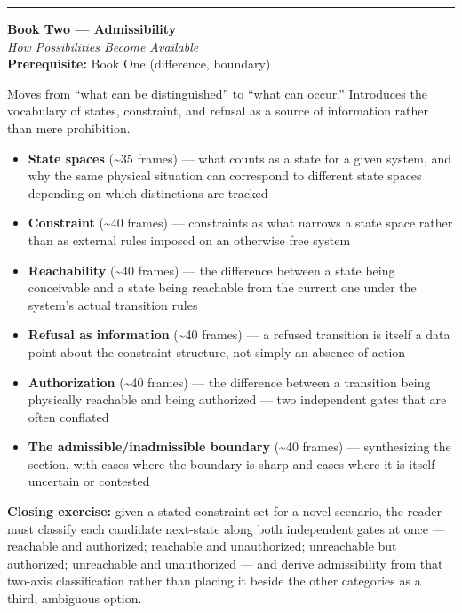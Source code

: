 \documentclass[11pt]{article}
\newenvironment{bookentry}[3]{%
  \par\noindent\rule{\linewidth}{0.5pt}\par\vspace{0.5em}
  {\Large\bfseries #1}\\[0.15em]
  {\itshape\large #2}\\[0.3em]
  {\small\textbf{Prerequisite:} #3}\par\vspace{0.6em}
}{\par\vspace{0.8em}}
\newenvironment{sectionlist}{%
  \begin{itemize}[leftmargin=1.4em, itemsep=0.45em, topsep=0.3em]
}{%
  \end{itemize}
}
\newcommand{\secitem}[3]{\item \textbf{#1} (\textasciitilde#2 frames) --- #3}
\begin{document}
\begin{bookentry}{Book Two --- Admissibility}{How Possibilities Become Available}{Book One (difference, boundary)}
Moves from ``what can be distinguished'' to ``what can occur.'' Introduces the vocabulary of states, constraint, and refusal as a source of information rather than mere prohibition.

\begin{sectionlist}
\secitem{State spaces}{35}{what counts as a state for a given system, and why the same physical situation can correspond to different state spaces depending on which distinctions are tracked}
\secitem{Constraint}{40}{constraints as what narrows a state space rather than as external rules imposed on an otherwise free system}
\secitem{Reachability}{40}{the difference between a state being conceivable and a state being reachable from the current one under the system's actual transition rules}
\secitem{Refusal as information}{40}{a refused transition is itself a data point about the constraint structure, not simply an absence of action}
\secitem{Authorization}{40}{the difference between a transition being physically reachable and being authorized --- two independent gates that are often conflated}
\secitem{The admissible/inadmissible boundary}{40}{synthesizing the section, with cases where the boundary is sharp and cases where it is itself uncertain or contested}
\end{sectionlist}
\textbf{Closing exercise:} given a stated constraint set for a novel scenario, the reader must classify each candidate next-state along both independent gates at once --- reachable and authorized; reachable and unauthorized; unreachable but authorized; unreachable and unauthorized --- and derive admissibility from that two-axis classification rather than placing it beside the other categories as a third, ambiguous option.
\end{bookentry}
\end{document}
